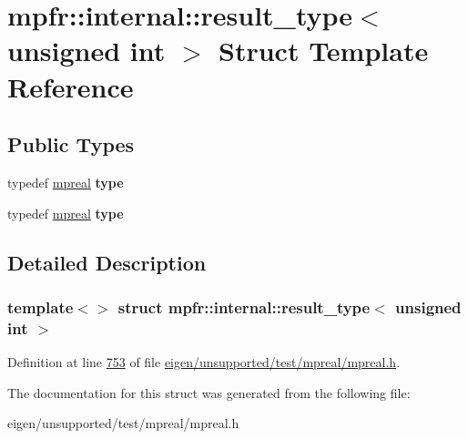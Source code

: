 \hypertarget{structmpfr_1_1internal_1_1result__type_3_01unsigned_01int_01_4}{}\section{mpfr\+:\+:internal\+:\+:result\+\_\+type$<$ unsigned int $>$ Struct Template Reference}
\label{structmpfr_1_1internal_1_1result__type_3_01unsigned_01int_01_4}
\subsection*{Public Types}
\begin{DoxyCompactItemize}
\item 
\mbox{\label{structmpfr_1_1internal_1_1result__type_3_01unsigned_01int_01_4_a3e860184c373bc87a1ac6e496c47a773}} 
typedef \hyperlink{classmpfr_1_1mpreal}{mpreal} {\bfseries type}
\item 
\mbox{\label{structmpfr_1_1internal_1_1result__type_3_01unsigned_01int_01_4_a3e860184c373bc87a1ac6e496c47a773}} 
typedef \hyperlink{classmpfr_1_1mpreal}{mpreal} {\bfseries type}
\end{DoxyCompactItemize}


\subsection{Detailed Description}
\subsubsection*{template$<$$>$\newline
struct mpfr\+::internal\+::result\+\_\+type$<$ unsigned int $>$}



Definition at line \hyperlink{eigen_2unsupported_2test_2mpreal_2mpreal_8h_source_l00753}{753} of file \hyperlink{eigen_2unsupported_2test_2mpreal_2mpreal_8h_source}{eigen/unsupported/test/mpreal/mpreal.\+h}.



The documentation for this struct was generated from the following file\+:\begin{DoxyCompactItemize}
\item 
eigen/unsupported/test/mpreal/mpreal.\+h\end{DoxyCompactItemize}
